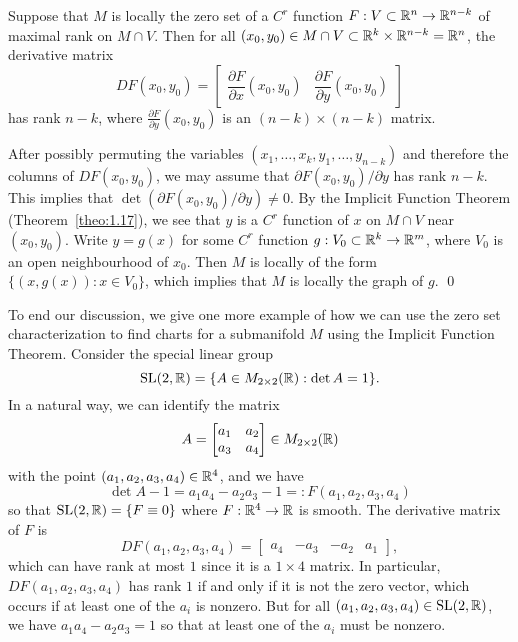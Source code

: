 \begin{pf}
    Suppose that $M$ is locally the zero set of a $C^r$ function $F : 
    V \subset \mathbb{R}^n \to \mathbb{R}^{n-k}$ of maximal rank on $M \cap V$. Then 
    for all $(x_0, y_0) \in M \cap V \subset \mathbb{R}^k \times \mathbb{R}^{n-k} = \mathbb{R}^n$, 
    the derivative matrix 
    \[ DF(x_0, y_0) = \left[ \begin{array}{c|c}
        \!\!\dfrac{\partial F}{\partial x}(x_0, y_0) & \dfrac{\partial F}{\partial y}(x_0, y_0)\!\!
    \end{array} \right] \] 
    has rank $n-k$, where $\frac{\partial F}{\partial y}(x_0, y_0)$ is 
    an $(n-k) \times (n-k)$ matrix.

    After possibly permuting the variables $(x_1, \dots, x_k, y_1, \dots, 
    y_{n-k})$ and therefore the columns of $DF(x_0, y_0)$, we may assume that 
    $\partial F(x_0, y_0)/\partial y$ has rank $n-k$. This implies that 
    $\det(\partial F(x_0, y_0)/\partial y) \neq 0$. By the Implicit 
    Function Theorem (Theorem~\ref{theo:1.17}), we see that $y$ 
    is a $C^r$ function of $x$ on $M \cap V$ near $(x_0, y_0)$. 
    Write $y = g(x)$ for some $C^r$ function $g : V_0 \subset \mathbb{R}^k 
    \to \mathbb{R}^m$, where $V_0$ is an open neighbourhood of $x_0$. 
    Then $M$ is locally of the form $\{(x, g(x)) : x \in V_0\}$,
    which implies that $M$ is locally the graph of $g$. \qed 
\end{pf}\vspace{-0.25cm}

To end our discussion, we give one more example of how we can use the 
zero set characterization to find charts for a submanifold $M$ 
using the Implicit Function Theorem. Consider the special linear group 
\[ \operatorname{SL}(2, \mathbb{R}) = \{A \in M_{2\times 2}(\mathbb{R}) : \det A = 1\}. \] 
In a natural way, we can identify the matrix 
\[ A = \begin{bmatrix}
    a_1 & a_2 \\ a_3 & a_4 
\end{bmatrix} \in M_{2\times 2}(\mathbb{R}) \] 
with the point $(a_1, a_2, a_3, a_4) \in \mathbb{R}^4$, and we have 
\[ \det A - 1 = a_1 a_4 - a_2 a_3 - 1 =: F(a_1, a_2, a_3, a_4) \] 
so that $\operatorname{SL}(2, \mathbb{R}) = \{F \equiv 0\}$ where $F : \mathbb{R}^4 \to \mathbb{R}$ is smooth. 
The derivative matrix of $F$ is 
\[ DF(a_1, a_2, a_3, a_4) = \begin{bmatrix}
    a_4 & -a_3 & -a_2 & a_1
\end{bmatrix}, \] 
which can have rank at most $1$ since it is a $1 \times 4$ matrix.
In particular, $DF(a_1, a_2, a_3, a_4)$ has rank $1$ if and only if it is 
not the zero vector, which occurs if at least one of the $a_i$ is nonzero. But 
for all $(a_1, a_2, a_3, a_4) \in \operatorname{SL}(2, \mathbb{R})$, we have $a_1a_4 - a_2a_3 = 1$ 
so that at least one of the $a_i$ must be nonzero. 

